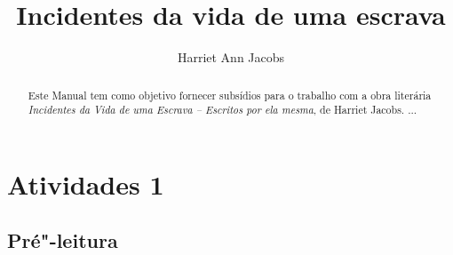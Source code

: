 \documentclass[12pt]{extarticle}
\begin{document}
\newcommand{\AutorLivro}{Harriet Ann Jacobs}
\newcommand{\TituloLivro}{Incidentes da vida de uma escrava}
\newcommand{\Tema}{Diálogos com a sociologia e com a antropologia}
\newcommand{\Genero}{Diário, biografia, autobiografia, relatos, memórias}
\newcommand{\imagemCapa}{./images/PNLD0020-01.png}
\newcommand{\issnppub}{---}
\newcommand{\issnepub}{---}
\newcommand{\colaborador}{\textbf{Eduardo Modesto de Carvalho, Bruno Gradella e Vicente Castro} é uma pessoa incrível e vai fazer um bom serviço.}


\title{\TituloLivro}
\author{\AutorLivro}
\def\authornotes{\colaborador}

\date{}
\maketitle

\begin{abstract}

Este Manual tem como objetivo fornecer subsídios para o trabalho com a
obra literária \emph{Incidentes da Vida de uma Escrava -- Escritos por
ela mesma}, de Harriet Jacobs.
...

\end{abstract}

\tableofcontents


\section{Atividades 1}


\subsection{Pré"-leitura}

\bnccativividadespreleitura
\end{document}
